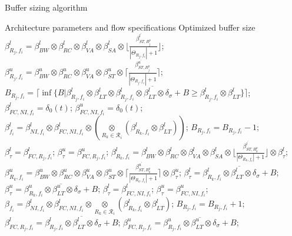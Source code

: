 \documentclass[preprint]{elsarticle}
\begin{document}
\begin{algorithm}
\caption{Buffer sizing algorithm}
\label{alg:bufopt}
\begin{algorithmic}[1]
\Require Architecture parameters and flow specifications
\Ensure Optimized buffer size
            \State $\beta_{R_j,f_i}^l=\beta_{BW}^l\otimes\beta_{RC}^l\otimes\beta_{VA}^l\otimes\beta_{SA}^l\otimes\lfloor\frac{\beta_{ST,R_j^{p}}^{l^\prime}}{|\Theta_{R_j,f_i}|+1}\rfloor$;
            \State $\beta_{R_j,f_i}^u=\beta_{BW}^u\otimes\beta_{RC}^u\otimes\beta_{VA}^u\otimes\beta_{ST}^u\otimes\lceil\frac{\beta_{ST,R_j^{p}}^{u^\prime}}{|\Theta_{R_j,f_i}|+1}\rceil$;
            \State $B_{R_j,f_i}=\lceil\inf\{B|\beta_{R_j,f_i}^l\otimes\beta_{LT}^l\otimes\overline{\beta_{R_j,f_i}^l\otimes\beta_{LT}^l\otimes\delta_\sigma+B}\geq\beta_{R_j,f_i}^l\otimes\beta_{LT}^l\}\rceil$;
        \EndFor
        \State $\beta_{FC,NI,f_i}^l=\delta_0(t)$; $\beta_{FC,NI,f_i}^u=\delta_0(t)$;
            \State $\beta_{f_i}^l=\beta_{NI,f_i}^l\otimes\beta_{FC,NI,f_i}^l\otimes(\underset{R_k\in\mathcal{R}_{i}}{\otimes}(\beta^l_{R_k,f_i}\otimes\beta^l_{LT}))$;
                \State $B_{R_j,f_i}=B_{R_j,f_i}-1$;
                \State $\beta_\tau^l=\beta_{FC,R_j,f_i}^l$; $\beta_\tau^u=\beta_{FC,R_j,f_i}^u$;
                    \State $\beta_{R_k,f_i}^l=\beta_{BW}^l\otimes\beta_{RC}^l\otimes\beta_{VA}^l\otimes\beta_{SA}^l\otimes\lfloor\frac{\beta_{ST,R_k^{p}}^{l^\prime}}{|\Theta_{R_k,f_i}|+1}\rfloor\otimes\beta_{\tau}^l$;
                    \State $\beta_{R_k,f_i}^u=\beta_{BW}^u\otimes\beta_{RC}^u\otimes\beta_{VA}^u\otimes\beta_{ST}^u\otimes\lceil\frac{\beta_{ST,R_k^{p}}^{u^\prime}}{|\Theta_{R_k,f_i}|+1}\rceil\otimes\beta_{\tau}^u$;
                    \State $\beta_{\tau}^l=\overline{\beta_{R_k,f_i}^l\otimes\beta_{LT}^l\otimes\delta_{\sigma}+B}$;
                    \State $\beta_{\tau}^u=\overline{\beta_{R_k,f_i}^u\otimes\beta_{LT}^u\otimes\delta_{\sigma}+B}$;
                \EndFor
                \State $\beta_\tau^l=\beta_{FC,NI,f_i}^l$; $\beta_\tau^u=\beta_{FC,NI,f_i}^u$;
                \State $\beta_{f_i}=\beta^l_{NI,f_i}\otimes\beta_{FC,NI,f_i}^l\otimes\underset{R_k\in\mathcal{R}_{i}}{\otimes}(\beta^l_{R_k,f_i}\otimes\beta^l_{LT})$;
            \EndWhile
                \State $B_{R_j,f_i}=B_{R_j,f_i}+1$;
                \State $\beta_{FC,R_j,f_i}^l=\overline{\beta_{R_j,f_i}^l\otimes\beta_{LT}^l\otimes\delta_{\sigma}+B}$;
                \State $\beta_{FC,R_j,f_i}^u=\overline{\beta_{R_j,f_i}^u\otimes\beta_{LT}^u\otimes\delta_{\sigma}+B}$;
            \EndIf
        \EndFor
    \EndFor
\end{algorithmic}
\end{algorithm}
\end{document}
